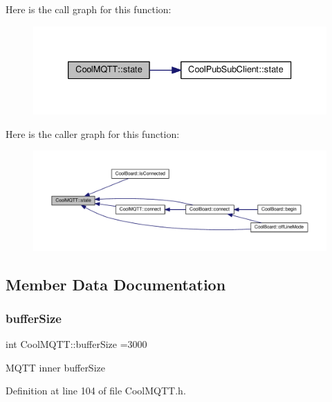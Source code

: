Here is the call graph for this function\+:\nopagebreak
\begin{figure}[H]
\begin{center}
\leavevmode
\includegraphics[width=333pt]{class_cool_m_q_t_t_a5d003307eff78efbd585e42b43b72b6d_cgraph}
\end{center}
\end{figure}
Here is the caller graph for this function\+:\nopagebreak
\begin{figure}[H]
\begin{center}
\leavevmode
\includegraphics[width=350pt]{class_cool_m_q_t_t_a5d003307eff78efbd585e42b43b72b6d_icgraph}
\end{center}
\end{figure}


\subsection{Member Data Documentation}
\mbox{\label{class_cool_m_q_t_t_a7f3cf26b51d6770f216e42c5ef13ca9f}} 
\subsubsection{\texorpdfstring{buffer\+Size}{bufferSize}}
{\footnotesize\ttfamily int Cool\+M\+Q\+T\+T\+::buffer\+Size =3000\hspace{0.3cm}{\ttfamily [private]}}

M\+Q\+TT inner buffer\+Size 

Definition at line 104 of file Cool\+M\+Q\+T\+T.\+h.

